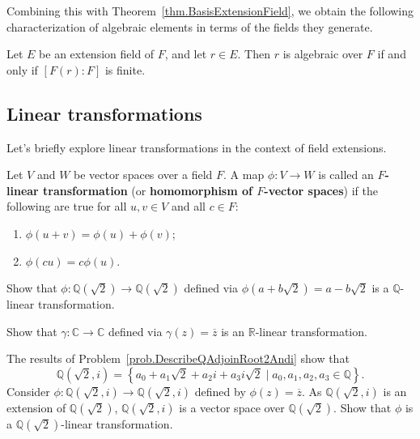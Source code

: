 Combining this with Theorem~\ref{thm.BasisExtensionField}, we obtain the following characterization of algebraic elements in terms of the fields they generate.

\begin{corollary}
Let $E$ be an extension field of $F$, and let $r\in E$. Then $r$ is algebraic over $F$ if and only if $[F(r):F]$ is finite.
\end{corollary}

\subsection{Linear transformations}
Let's briefly explore linear transformations in the context of field extensions.

\begin{definition}
Let $V$ and $W$ be vector spaces over a field $F$. A map $\phi:V\to W$ is called an \textbf{$F$-linear transformation} (or \textbf{homomorphism of $F$-vector spaces}) if the following are true for all $u,v\in V$ and all $c\in F$:
\begin{enumerate}
\item $\phi(u+v)=\phi(u)+\phi(v)$;
\item $\phi(cu)=c\phi(u)$.
\end{enumerate}
\end{definition}

\begin{problem}
Show that $\phi:\mathbb{Q}(\sqrt{2})\rightarrow\mathbb{Q}(\sqrt{2})$ defined via $\phi(a+b\sqrt{2}) = a-b\sqrt{2}$ is a $\mathbb{Q}$-linear transformation.
\end{problem}

\begin{problem}
Show that $\gamma:\mathbb{C}\rightarrow\mathbb{C}$ defined via $\gamma(z) = \overline{z}$ is an $\mathbb{R}$-linear transformation.
\end{problem}

\begin{problem}
The results of Problem~\ref{prob.DescribeQAdjoinRoot2Andi} show that 
\[\mathbb{Q}(\sqrt{2},i) = \left\{a_0+a_1\sqrt{2} + a_2i + a_3i\sqrt{2}\mid a_0,a_1,a_2,a_3\in \mathbb{Q}\right\}.\]
Consider $\phi:\mathbb{Q}(\sqrt{2},i)\rightarrow\mathbb{Q}(\sqrt{2},i)$ defined by $\phi(z) = \overline{z}$. 
As $\mathbb{Q}(\sqrt{2},i)$ is an extension of $\mathbb{Q}(\sqrt{2})$, $\mathbb{Q}(\sqrt{2},i)$ is a vector space over $\mathbb{Q}(\sqrt{2})$. Show that $\phi$ is a $\mathbb{Q}(\sqrt{2})$-linear transformation.
\end{problem}


